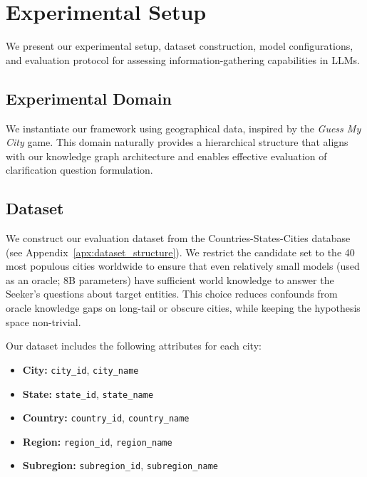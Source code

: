 \documentclass[letterpaper]{article} %
\begin{document}



\section{Experimental Setup}

We present our experimental setup, dataset construction, model configurations, and evaluation protocol for assessing information-gathering capabilities in LLMs.

\subsection{Experimental Domain}

We instantiate our framework using geographical data, inspired by the \emph{Guess My City} game. This domain naturally provides a hierarchical structure that aligns with our knowledge graph architecture and enables effective evaluation of clarification question formulation.


\subsection{Dataset}

We construct our evaluation dataset from the Countries-States-Cities database (see Appendix~\ref{apx:dataset_structure}). We restrict the candidate set to the 40 most populous cities worldwide to ensure that even relatively small models (used as an oracle; 8B parameters) have sufficient world knowledge to answer the Seeker's questions about target entities. This choice reduces confounds from oracle knowledge gaps on long-tail or obscure cities, while keeping the hypothesis space non-trivial.

Our dataset includes the following attributes for each city: 
\begin{itemize}
    \item \textbf{City:} \texttt{city\_id}, \texttt{city\_name}
    \item \textbf{State:} \texttt{state\_id}, \texttt{state\_name}
    \item \textbf{Country:} \texttt{country\_id}, \texttt{country\_name}
    \item \textbf{Region:} \texttt{region\_id}, \texttt{region\_name}
    \item \textbf{Subregion:} \texttt{subregion\_id}, \texttt{subregion\_name}
\end{itemize}
\end{document}
